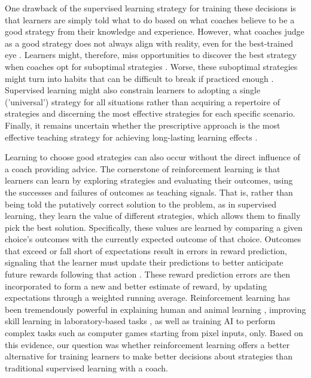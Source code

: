 \documentclass[pdflatex,sn-mathphys-num]{sn-jnl}%
\theoremstyle{thmstyleone}%
\theoremstyle{thmstyletwo}%
\theoremstyle{thmstylethree}%
\begin{document}
One drawback of the supervised learning strategy for training these decisions is that learners are simply told what to do based on what coaches believe to be a good strategy from their knowledge and experience. However, what coaches judge as a good strategy does not always align with reality, even for the best-trained eye \cite{supej_impact_2019, cochrum_visual_2021}. Learners might, therefore, miss opportunities to discover the best strategy when coaches opt for suboptimal strategies \cite{gray_plateaus_2017}. Worse, these suboptimal strategies might turn into habits that can be difficult to break if practiced enough \cite{popp_effect_2020}. Supervised learning might also constrain learners to adopting a single ('universal') strategy for all situations rather than acquiring a repertoire of strategies and discerning the most effective strategies for each specific scenario. Finally, it remains uncertain whether the prescriptive approach is the most effective teaching strategy for achieving long-lasting learning effects \cite{wulf_instructions_1997, hodges_role_1999, williams_practice_2005,williams_effective_2023}.

Learning to choose good strategies can also occur without the direct influence of a coach providing advice. The cornerstone of reinforcement learning \cite{sutton_reinforcement_2018} is that learners can learn by exploring strategies and evaluating their outcomes, using the successes and failures of outcomes as teaching signals. That is, rather than being told the putatively correct solution to the problem, as in supervised learning, they learn the value of different strategies, which allows them to finally pick the best solution. Specifically, these values are learned by comparing a given choice's outcomes with the currently expected outcome of that choice. Outcomes that exceed or fall short of expectations result in errors in reward prediction, signaling that the learner must update their predictions to better anticipate future rewards following that action \cite{rescorla_theory_1972}. These reward prediction errors are then incorporated to form a new and better estimate of reward, by updating expectations through a weighted running average. Reinforcement learning has been tremendously powerful in explaining human and animal learning \cite{waelti_dopamine_2001, schultz_neural_1997, pessiglione_dopamine-dependent_2006}, improving skill learning in laboratory-based tasks \cite{lior_shmuelof_overcoming_2012, abe_reward_2011, truong_error-based_2023, hasson_reinforcement_2015}, as well as training AI to perform complex tasks such as computer games starting from pixel inputs, only\cite{mnih_human-level_2015}. Based on this evidence, our question was whether reinforcement learning offers a better alternative for training learners to make better decisions about strategies than traditional supervised learning with a coach. 
\end{document}
